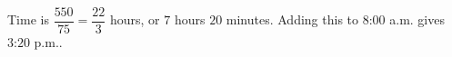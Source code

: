 Time is $\dfrac{550}{75}=\dfrac{22}{3}$ hours, or $7$ hours $20$ minutes. Adding this to 8:00 a.m. gives $\boxed{\text{3:20 p.m.}}$.
